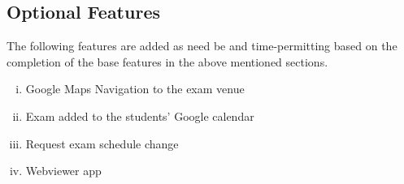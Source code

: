 \documentclass{article}
\begin{document}
\subsection{Optional Features}

The following features are added as need be and time-permitting based on the completion of the base features in the above mentioned sections.

\begin{enumerate}[i., leftmargin=*]
	\item Google Maps Navigation to the exam venue
	\item Exam added to the students' Google calendar
	\item Request exam schedule change
	\item Webviewer app
\end{enumerate}
\end{document}
